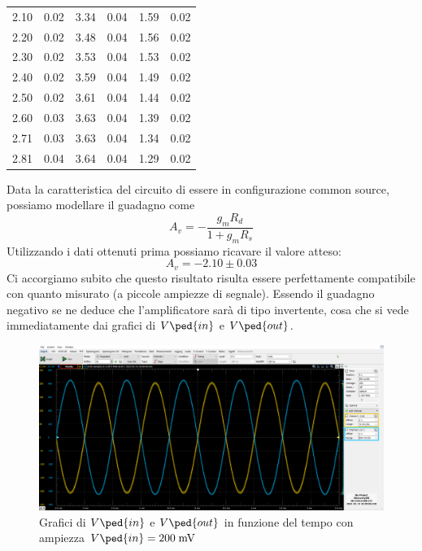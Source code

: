 \documentclass[10pt, a4paper, italian]{article}
\begin{document}
\begin{table}[H]
\begin{tabular}{cccccc}
2.10  & 0.02 & 3.34  & 0.04 & 1.59 & 0.02 \\
2.20  & 0.02 & 3.48  & 0.04 & 1.56 & 0.02 \\
2.30  & 0.02 & 3.53  & 0.04 & 1.53 & 0.02 \\
2.40  & 0.02 & 3.59  & 0.04 & 1.49 & 0.02 \\
2.50  & 0.02 & 3.61  & 0.04 & 1.44 & 0.02 \\
2.60  & 0.03 & 3.63  & 0.04 & 1.39 & 0.02 \\
2.71  & 0.03 & 3.63  & 0.04 & 1.34 & 0.02 \\
2.81  & 0.04 & 3.64  & 0.04 & 1.29 & 0.02 \\
\bottomrule
\end{tabular}
\end{table}
Data la caratteristica del circuito di essere in configurazione common source, possiamo modellare il guadagno come
\begin{equation}
A_v = -\frac{g_m R_d}{1+g_mR_s}
\end{equation}
Utilizzando i dati ottenuti prima possiamo ricavare il valore atteso:
\[
A_v = -2.10 \pm 0.03
\]
Ci accorgiamo subito che questo risultato risulta essere perfettamente compatibile con quanto misurato (a piccole ampiezze di segnale).
Essendo il guadagno negativo se ne deduce che l'amplificatore sarà di tipo invertente, cosa che si vede immediatamente dai grafici di $V\ped{in}$ e $V\ped{out}$.
\begin{figure}[htbp]
    \centering
	\includegraphics[scale=0.4]{amp.200}
    \caption{Grafici di $V\ped{in}$ e $V\ped{out}$ in funzione del tempo con ampiezza $V\ped{in}=200 \; \si{m\V}$}
\end{figure}
\end{document}

